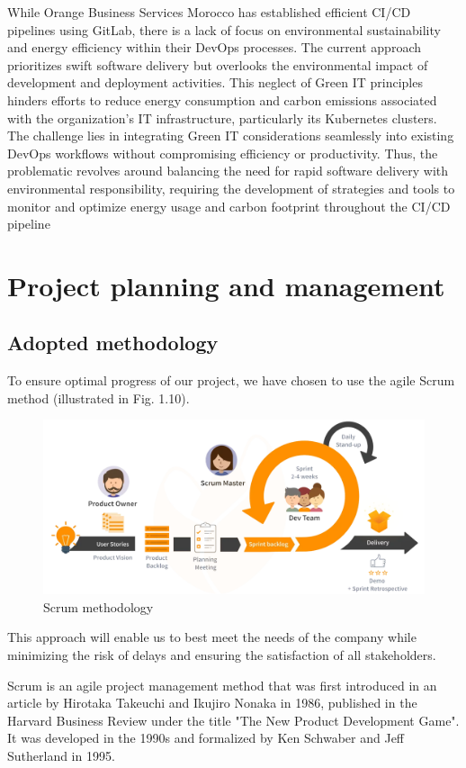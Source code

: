 While Orange Business Services Morocco has established efficient CI/CD pipelines using GitLab, there is a lack of focus on environmental sustainability and energy efficiency within their DevOps processes. The current approach prioritizes swift software delivery but overlooks the environmental impact of development and deployment activities. This neglect of Green IT principles hinders efforts to reduce energy consumption and carbon emissions associated with the organization's IT infrastructure, particularly its Kubernetes clusters. The challenge lies in integrating Green IT considerations seamlessly into existing DevOps workflows without compromising efficiency or productivity. Thus, the problematic revolves around balancing the need for rapid software delivery with environmental responsibility, requiring the development of strategies and tools to monitor and optimize energy usage and carbon footprint throughout the CI/CD pipeline
\section{Project planning and management}
\subsection{Adopted methodology}

To ensure optimal progress of our project, we have chosen to use the agile Scrum method (illustrated in Fig. 1.10).

\begin{figure}[H]
  \centering
  \includegraphics[width=17.5cm]{Figures/scrum.png}
  \caption{Scrum methodology}
\end{figure}

This approach will enable us to best meet the needs of the company while minimizing the risk of delays and ensuring the satisfaction of all stakeholders.

Scrum is an agile project management method that was first introduced in an article by Hirotaka Takeuchi and Ikujiro Nonaka in 1986, published in the Harvard Business Review under the title "The New Product Development Game". It was developed in the 1990s and formalized by Ken Schwaber and Jeff Sutherland in 1995.

